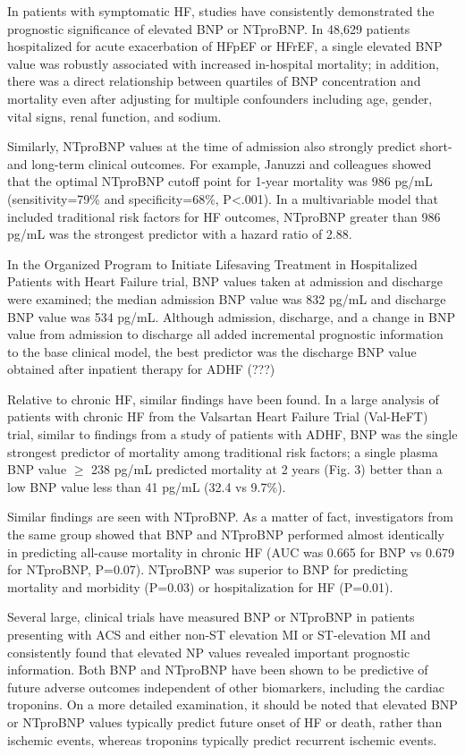 \documentclass[14pt,a4paper,onecolumn]{extarticle}
\begin{document}
In patients with symptomatic HF, studies have consistently demonstrated the prognostic significance of elevated BNP or NTproBNP. In 48,629 patients hospitalized for acute exacerbation of HFpEF or HFrEF, a single elevated BNP value was robustly associated with increased in-hospital mortality; in addition, there was a direct relationship between quartiles of BNP concentration and mortality even after adjusting for multiple confounders including age, gender, vital signs, renal function, and sodium. \citep{Fonarow2007}

Similarly, NTproBNP values at the time of admission also strongly predict short- and long-term clinical outcomes. For example, Januzzi and colleagues showed that the optimal NTproBNP cutoff point for 1-year mortality was 986 pg/mL (sensitivity=79\% and specificity=68\%, P<.001). In a multivariable model that included traditional risk factors for HF outcomes, NTproBNP greater than 986 pg/mL was the strongest predictor with a hazard ratio of 2.88. \citep{Januzzi2006b}

In the Organized Program to Initiate Lifesaving Treatment in Hospitalized Patients with Heart Failure trial, BNP values taken at admission and discharge were examined; the median admission BNP value was 832 pg/mL and discharge BNP value was 534 pg/mL. Although admission, discharge, and a change in BNP value from admission to discharge all added incremental prognostic information to the base clinical model, the best predictor was the discharge BNP value obtained after inpatient therapy for ADHF (???)

Relative to chronic HF, similar findings have been found. In a large analysis of patients with chronic HF from the Valsartan Heart Failure Trial (Val-HeFT) trial, similar to findings from a study of patients with ADHF, BNP was the single strongest predictor of mortality among traditional risk factors; a single plasma BNP value $\geq$ 238 pg/mL predicted mortality at 2 years (Fig. 3) better than a low BNP value less than 41 pg/mL (32.4 vs 9.7\%). \citep{Anand2003}

Similar findings are seen with NTproBNP. As a matter of fact, investigators from the same group showed that BNP and NTproBNP performed almost identically in predicting all-cause mortality in chronic HF (AUC was 0.665 for BNP vs 0.679 for NTproBNP, P=0.07). NTproBNP was superior to BNP for predicting mortality and morbidity (P=0.03) or hospitalization for HF (P=0.01). \citep{Masson2006}

Several large, clinical trials have measured BNP or NTproBNP in patients presenting with ACS and either non-ST elevation MI or ST-elevation MI and consistently found that elevated NP values revealed important prognostic information. Both BNP and NTproBNP have been shown to be predictive of future adverse outcomes independent of other biomarkers, including the cardiac troponins. On a more detailed examination, it should be noted that elevated BNP or NTproBNP values typically predict future onset of HF or death, rather than ischemic events, whereas troponins typically predict recurrent ischemic events. \citep{Gaggin2014}
\end{document}

